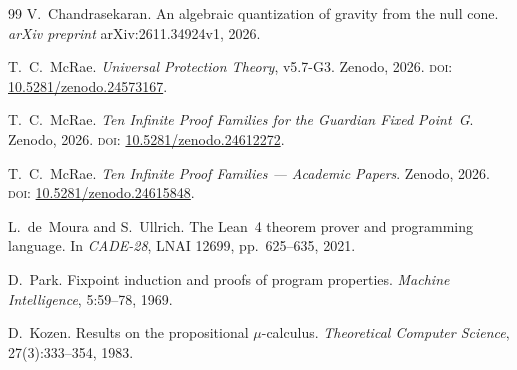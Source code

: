 \documentclass[11pt,a4paper]{article}
\theoremstyle{definition}
\theoremstyle{remark}
\begin{document}
\begin{thebibliography}{99}
V.~Chandrasekaran.
An algebraic quantization of gravity from the null cone.
\emph{arXiv preprint} arXiv:2611.34924v1, 2026.

T.~C.~McRae.
\emph{Universal Protection Theory}, v5.7-G3.
Zenodo, 2026.
\textsc{doi:} \href{https://doi.org/10.5281/zenodo.24573167}{10.5281/zenodo.24573167}.

T.~C.~McRae.
\emph{Ten Infinite Proof Families for the Guardian Fixed Point~G}.
Zenodo, 2026.
\textsc{doi:} \href{https://doi.org/10.5281/zenodo.24612272}{10.5281/zenodo.24612272}.

T.~C.~McRae.
\emph{Ten Infinite Proof Families --- Academic Papers}.
Zenodo, 2026.
\textsc{doi:} \href{https://doi.org/10.5281/zenodo.24615848}{10.5281/zenodo.24615848}.

L.~de~Moura and S.~Ullrich.
The Lean~4 theorem prover and programming language.
In \emph{CADE-28}, LNAI 12699, pp.~625--635, 2021.

D.~Park.
Fixpoint induction and proofs of program properties.
\emph{Machine Intelligence}, 5:59--78, 1969.

D.~Kozen.
Results on the propositional $\mu$-calculus.
\emph{Theoretical Computer Science}, 27(3):333--354, 1983.
\end{thebibliography}
\end{document}
